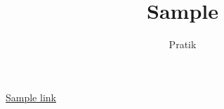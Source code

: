 \documentclass[12pt]{article}
\begin{document}
\title{Sample}
\author{Pratik}\maketitle

\href{https://www.google.com}{Sample link}
\end{document}

